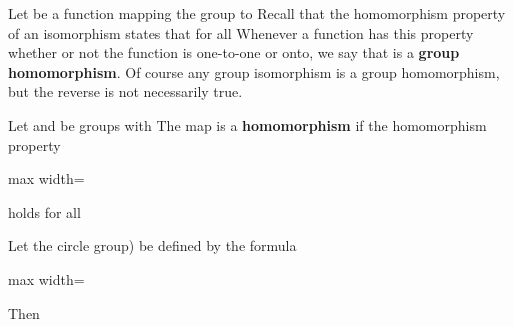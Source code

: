 \documentclass[11pt,oneside]{article}
\begin{document}
\fi
\renewcommand{\BookFooter}{Section 8 Groups of Permutations}
\ifdefined\BookMaster\else\setcounter{page}{77}\fi

\BookNarrativetrue

\begin{BookBody}


\noindent Let  be a function mapping the group  to  Recall that the homomorphism property of an isomorphism states that for all  Whenever a function has this property whether or not the function is one-to-one or onto, we say that \BookInline{\phi } is a\textbf{ group homomorphism}. Of course any group isomorphism is a group homomorphism, but the reverse is not necessarily true.

 Let  and  be groups with  The map \BookInline{\phi } is a\textbf{ homomorphism} if the homomorphism property

\begin{center}\begin{adjustbox}{max width=\linewidth}\end{adjustbox}\end{center}

\noindent holds for all  \BookEnd{\blacksquare}

 Let the circle group) be defined by the formula

\begin{center}\begin{adjustbox}{max width=\linewidth}\end{adjustbox}\end{center}

\noindent Then


\end{BookBody}
\end{document}
